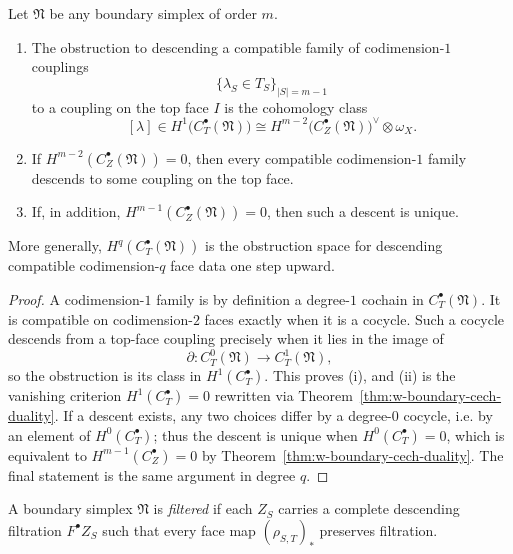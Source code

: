 \begin{theorem}
Let $\mathfrak N$ be any boundary simplex of order $m$.
\begin{enumerate}[label=(\roman*)]
\item The obstruction to descending a compatible family of codimension-$1$ couplings
\[
\{\lambda_S\in T_S\}_{|S|=m-1}
\]
to a coupling on the top face $I$ is the cohomology class
\[
[\lambda]\in H^1\bigl(C_T^\bullet(\mathfrak N)\bigr)
\cong
H^{m-2}\bigl(C_Z^\bullet(\mathfrak N)\bigr)^\vee\otimes \omega_X.
\]
\item If $H^{m-2}(C_Z^\bullet(\mathfrak N))=0$, then every compatible codimension-$1$ family descends to
some coupling on the top face.
\item If, in addition, $H^{m-1}(C_Z^\bullet(\mathfrak N))=0$, then such a descent is unique.
\end{enumerate}
More generally, $H^q(C_T^\bullet(\mathfrak N))$ is the obstruction space for descending compatible
codimension-$q$ face data one step upward.
\end{theorem}

\begin{proof}
A codimension-$1$ family is by definition a degree-$1$ cochain in $C_T^\bullet(\mathfrak N)$. It is
compatible on codimension-$2$ faces exactly when it is a cocycle. Such a cocycle descends from a top-face
coupling precisely when it lies in the image of
\[
\partial\colon C_T^0(\mathfrak N)\to C_T^1(\mathfrak N),
\]
so the obstruction is its class in $H^1(C_T^\bullet)$. This proves (i), and (ii) is the vanishing criterion
$H^1(C_T^\bullet)=0$ rewritten via Theorem~\ref{thm:w-boundary-cech-duality}. If a descent exists, any two
choices differ by a degree-$0$ cocycle, i.e. by an element of $H^0(C_T^\bullet)$; thus the descent is unique
when $H^0(C_T^\bullet)=0$, which is equivalent to $H^{m-1}(C_Z^\bullet)=0$ by Theorem~\ref{thm:w-boundary-cech-duality}.
The final statement is the same argument in degree $q$.
\end{proof}

\begin{definition}
A boundary simplex $\mathfrak N$ is \emph{filtered} if each $Z_S$ carries a complete descending filtration
$F^\bullet Z_S$ such that every face map $(\rho_{S,T})_*$ preserves filtration.
\end{definition}

